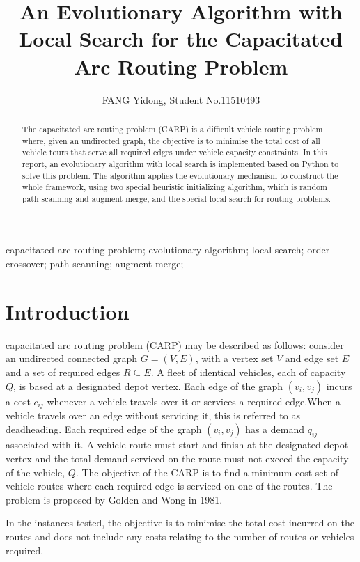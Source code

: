 \documentclass[journal,twoside,web]{ieeecolor}
\begin{document}
\title{An Evolutionary Algorithm with Local Search for the Capacitated Arc Routing Problem}
\author{FANG Yidong, Student No.11510493 
}

\maketitle

\begin{abstract}
The capacitated arc routing problem (CARP) is a difficult vehicle routing problem where, given an undirected graph, the objective is to minimise the total cost of all vehicle tours that serve all required edges under vehicle capacity constraints. In this report, an evolutionary algorithm with local search is implemented based on Python to solve this problem. The algorithm applies the evolutionary mechanism to construct the whole framework, using two special heuristic initializing algorithm, which is random path scanning and augment merge, and the special local search for routing problems.
\end{abstract}

\begin{IEEEkeywords}
capacitated arc routing problem;
evolutionary algorithm;
local search;
order crossover;
path scanning;
augment merge;
\end{IEEEkeywords}

\section{Introduction}
\label{sec:introduction}
 capacitated arc routing problem (CARP) may be described as follows: consider an undirected connected graph $G=(V,E)$, with a vertex set $V$ and edge set $E$ and a set of required edges $R \subseteq E$. A fleet of identical vehicles, each of capacity $Q$, is based at a designated depot vertex. Each edge of the graph $(v_i ,v_j)$ incurs a cost $c_{ij}$ whenever a vehicle travels over it or services a required edge.When a vehicle travels over an edge without servicing it, this is referred to as deadheading. Each required edge of the graph $(v_i ,v_j)$ has a demand $q_{ij}$ associated with it. A vehicle route must start and finish at the designated depot vertex and the total demand serviced on the route must not exceed the capacity of the vehicle, $Q$. The objective of the CARP is to find a minimum cost set of vehicle routes where each required edge is serviced on one of the routes. The problem is proposed by Golden and Wong in 1981\cite{Golden1981}.
\par
In the instances tested, the objective is to minimise the total cost incurred on the routes and does not include any
costs relating to the number of routes or vehicles required.
\end{document}
